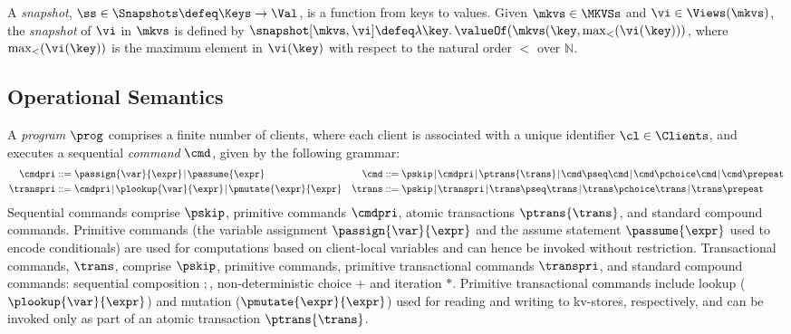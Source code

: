 \begin{definition}[Snapshots]
\label{def:heaps}
\label{def:snapshot}
A \emph{snapshot}, \( \ss \in \Snapshots  \defeq \Keys \to
\Val\),  is a function  from keys to values.
Given $\mkvs \in \MKVSs$ and $\vi \in \Views(\mkvs)$, the \emph{snapshot} of $\vi$ in 
$\mkvs$ is defined by  $\snapshot[\mkvs, \vi] \defeq \lambda \key \ldotp \valueOf(\mkvs(\key, \max_{<}(\vi(\key)))$, 
where $\max_{<}(\vi(\key))$ is the maximum element in $\vi(\key)$ with respect to the natural 
order $<$ over $\mathbb{N}$.
\end{definition}


\subsection{Operational Semantics}

A \emph{program} \( \prog \) comprises a finite number of clients,
where each client is associated with a unique identifier \( \cl \in \Clients \), 
and executes a sequential \emph{command} $\cmd$, given by the following grammar:%
%
{%
\begin{align*}
\cmdpri & ::=  
\passign{\var}{\expr} \!\mid\! 
\passume{\expr} 
&
\cmd & ::=  
\pskip \!\mid\!
\cmdpri \!\mid\!  
\ptrans{\trans} \!\mid\! 
\cmd \pseq \cmd \!\mid\! 
\cmd \pchoice \cmd \!\mid\! 
\cmd \prepeat  
\\
\transpri & ::= 
\cmdpri \!\mid\!
\plookup{\var}{\expr} \!\mid\!
\pmutate{\expr}{\expr} 
&
\trans & ::=
\pskip \!\mid\!
\transpri \!\mid\! 
\trans \pseq \trans \!\mid\!
\trans \pchoice \trans \!\mid\!
\trans\prepeat    
\end{align*}%
}%
%
%
Sequential commands  comprise $\pskip$,  primitive commands $\cmdpri
$, atomic transactions
$\ptrans{\trans}$,  and standard
compound commands. 
Primitive commands (the variable assignment
$\passign{\var}{\expr}$ and the assume statement $\passume{\expr}$
used to encode conditionals) are used for computations based on 
client-local variables 
and can hence be invoked without restriction. 
Transactional commands, $\trans$, 
comprise $\pskip$, primitive commands, 
primitive transactional commands $\transpri$,  and standard compound commands: 
sequential composition \( ; \), non-deterministic choice \( + \) and iteration \( * \).
Primitive transactional commands include lookup ($\plookup{\var}{\expr}$) and mutation 
($\pmutate{\expr}{\expr}$) used for reading and writing to kv-stores, respectively, and  
can be invoked only as part of an atomic transaction $\ptrans{\trans}$.


